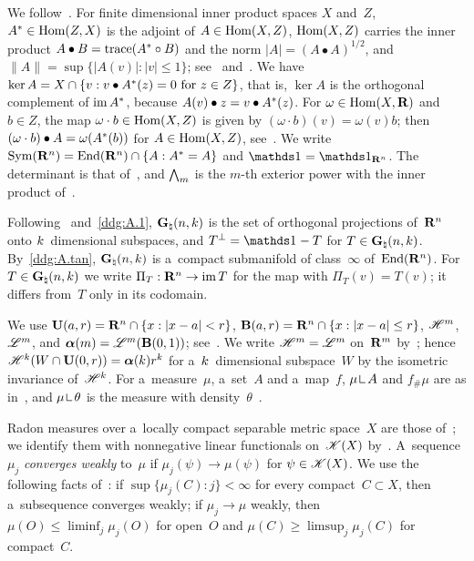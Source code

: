 \documentclass[a4paper,twoside,leqno]{article}
\newcommand{\Gk}{\pgrass{\adim}{\vdim}}        %
\begin{document}
\begin{miniremark}
    \label{mr:notation}
    We follow~\cite[pp.~669--671]{Federer1969}. For finite dimensional inner product spaces $X$
    and~$Z$, $A^{*} \in \operatorname{Hom}(Z,X)$ is the adjoint of $A \in \operatorname{Hom}(X,Z)$, $\operatorname{Hom}(X,Z)$
    carries the inner product $A \bullet B = \operatorname{trace}(A^{*} \circ B)$ and the norm $|A| = (A
    \bullet A)^{1/2}$, and $\|A\| = \sup \{ |A(v)| : |v| \le 1 \}$;
    see~\cite[1.7.4, 1.7.9]{Federer1969} and~\cite[2.2]{Allard1972}. We have $\ker A = X \cap
    \{ v : v \bullet A^{*}(z) = 0 \text{ for $z \in Z$} \}$, that is, $\ker A$ is the
    orthogonal complement of $\operatorname{im} A^{*}$, because $A(v) \bullet z = v \bullet
    A^{*}(z)$. For $\omega \in \operatorname{Hom}(X,\mathbf{R})$ and $b \in Z$, the map $\omega \cdot b \in
    \operatorname{Hom}(X,Z)$ is given by $(\omega \cdot b)(v) = \omega(v) b$; then $(\omega \cdot b) \bullet A =
    \omega(A^{*}(b))$ for $A \in \operatorname{Hom}(X,Z)$, see~\cite[2.3(4)]{Allard1972}. We write
    $\mathrm{Sym}({\mathbf{R}^{n}}) = \mathrm{End}({\mathbf{R}^{n}}) \cap \{ A : A^{*} = A \}$ and $\id{} =
    \id{\R^{\adim}}$. The determinant is that of~\cite[1.3.4]{Federer1969}, and ${\textstyle\boldsymbol{\bigwedge}}_{{m}}$ is
    the $m$-th exterior power with the inner product of~\cite[1.7.5]{Federer1969}.

    Following~\cite[2.3]{Allard1972} and~\ref{ddg:A.1}, $\Gk$ is the set of orthogonal
    projections of~$\mathbf{R}^{n}$ onto $k$~dimensional subspaces, and $T^\perp = \id{} - T$ for
    $T \in \Gk$. By~\ref{ddg:A.tan}, $\Gk$ is a~compact submanifold of class~$\infty$
    of~$\mathrm{End}({\mathbf{R}^{n}})$. For $T \in \Gk$ we write $\Pi_T : \mathbf{R}^{n} \to \operatorname{im} T$ for the map
    with $\Pi_T(v) = T(v)$; it differs from~$T$ only in its codomain.

    We use $\mathbf{U}(a,r) = \mathbf{R}^{n} \cap \{ x : |x - a| < r \}$, $\mathbf{B}(a,r) = \mathbf{R}^{n} \cap
    \{ x : |x - a| \le r \}$, $\mathscr{H}^m$, $\mathscr{L}^m$, and $\boldsymbol{\alpha}(m) = \mathscr{L}^m(\mathbf{B}(0,1))$;
    see~\cite[2.7.16, 2.10.2]{Federer1969}. We write $\mathscr{H}^m = \mathscr{L}^m$ on~$\mathbf{R}^m$
    by~\cite[2.10.35]{Federer1969}; hence $\mathscr{H}^{k}(W \cap \mathbf{U}(0,r)) =
    \boldsymbol{\alpha}(k) r^{k}$ for a~$k$~dimensional subspace~$W$ by the isometric
    invariance of~$\mathscr{H}^{k}$. For a~measure~$\mu$, a~set~$A$ and a~map~$f$, $\mu \restrict A$
    and $f_\# \mu$ are as in~\cite[2.1.2]{Federer1969}, and $\mu \restrict \theta$ is the measure
    with density~$\theta$~\cite[2.4.10]{Federer1969}.

    Radon measures over a~locally compact separable metric space~$X$ are those
    of~\cite[2.2.5]{Federer1969}; we identify them with nonnegative linear functionals
    on~$\mathscr{K}(X)$ by~\cite[2.5.14]{Federer1969}. A~sequence $\mu_j$ \emph{converges weakly}
    to~$\mu$ if $\mu_j(\psi) \to \mu(\psi)$ for $\psi \in \mathscr{K}(X)$. We use the following
    facts of~\cite[2.6(2)]{Allard1972}: if $\sup \{ \mu_j(C) : j \}< \infty$ for every compact~$C
    \subset X$, then a~subsequence converges weakly; if $\mu_j \to \mu$ weakly, then $\mu(O) \le
    \liminf_j \mu_j(O)$ for open~$O$ and $\mu(C) \ge \limsup_j \mu_j(C)$ for compact~$C$.


\end{miniremark}
\end{document}
